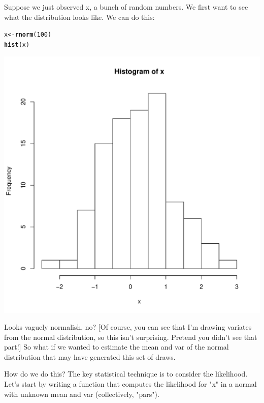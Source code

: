 \documentclass[letterpaper,12pt]{article}\usepackage[]{graphicx}\usepackage[]{color}
\makeatletter
\def\maxwidth{ %
  \ifdim\Gin@nat@width>\linewidth
    \linewidth
  \else
    \Gin@nat@width
  \fi
}
\newcommand{\hlnum}[1]{\textcolor[rgb]{0.686,0.059,0.569}{#1}}%
\newcommand{\hlstd}[1]{\textcolor[rgb]{0.345,0.345,0.345}{#1}}%
\newcommand{\hlkwb}[1]{\textcolor[rgb]{0.69,0.353,0.396}{#1}}%
\newcommand{\hlkwd}[1]{\textcolor[rgb]{0.737,0.353,0.396}{\textbf{#1}}}%
\newenvironment{kframe}{%
 \def\at@end@of@kframe{}%
 \ifinner\ifhmode%
  \def\at@end@of@kframe{\end{minipage}}%
  \begin{minipage}{\columnwidth}%
 \fi\fi%
 \def\FrameCommand##1{\hskip\@totalleftmargin \hskip-\fboxsep
 \colorbox{shadecolor}{##1}\hskip-\fboxsep
     \hskip-\linewidth \hskip-\@totalleftmargin \hskip\columnwidth}%
 \MakeFramed {\advance\hsize-\width
   \@totalleftmargin\z@ \linewidth\hsize
   \@setminipage}}%
 {\par\unskip\endMakeFramed%
 \at@end@of@kframe}
\newenvironment{knitrout}{}{} %
\numberwithin{equation}{section}
\makeatother
\begin{document}
Suppose we just observed x, a bunch of random numbers.
We first want to see what the distribution looks like. We can do this:

\begin{knitrout}
\color{fgcolor}\begin{kframe}
\begin{alltt}
\hlstd{x}\hlkwb{<-}\hlkwd{rnorm}\hlstd{(}\hlnum{100}\hlstd{)}
\hlkwd{hist}\hlstd{(x)}
\end{alltt}
\end{kframe}
\includegraphics[width=\maxwidth]{figure/unnamed-chunk-8-1} 

\end{knitrout}

Looks vaguely normalish, no? [Of course, you can see that I'm drawing variates from the normal distribution, so this isn't surprising. Pretend you didn't see that part!] So what if we wanted to estimate the mean and var of the normal distribution that may have generated this set of draws.

How do we do this? The key statistical technique is to consider the likelihood.
Let's start by writing a function that computes the likelihood for "x" in a normal with unknown mean and var (collectively, "pars").
\end{document}
